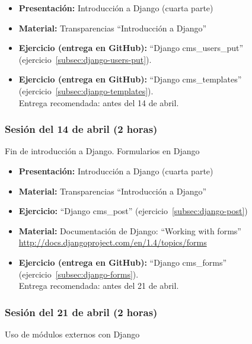 \documentclass[a4paper,12pt]{article}
\begin{document}
\begin{itemize}
 \item \textbf{Presentación:} Introducción a Django (cuarta parte)
 \item \textbf{Material:} Transparencias ``Introducción a Django''
 \item \textbf{Ejercicio (entrega en GitHub):} ``Django cms\_users\_put'' (ejercicio~\ref{subsec:django-users-put}).
 \item \textbf{Ejercicio (entrega en GitHub):} ``Django cms\_templates'' (ejercicio~\ref{subsec:django-templates}). \\
  Entrega recomendada: antes del 14 de abril.
\end{itemize}


\subsubsection{Sesión del 14 de abril (2 horas)}

Fin de introducción a Django. Formularios en Django

\begin{itemize}
    \item \textbf{Presentación:} Introducción a Django (cuarta parte)
    \item \textbf{Material:} Transparencias ``Introducción a Django''
    \item \textbf{Ejercicio:} ``Django cms\_post'' (ejercicio~\ref{subsec:django-post})
    \item \textbf{Material:} Documentación de Django: ``Working with forms'' \\
          \url{http://docs.djangoproject.com/en/1.4/topics/forms}
    \item \textbf{Ejercicio (entrega en GitHub):} ``Django cms\_forms'' (ejercicio~\ref{subsec:django-forms}). \\
  Entrega recomendada: antes del 21 de abril.
\end{itemize}

\subsubsection{Sesión del 21 de abril (2 horas)}

Uso de módulos externos con Django
\end{document}
